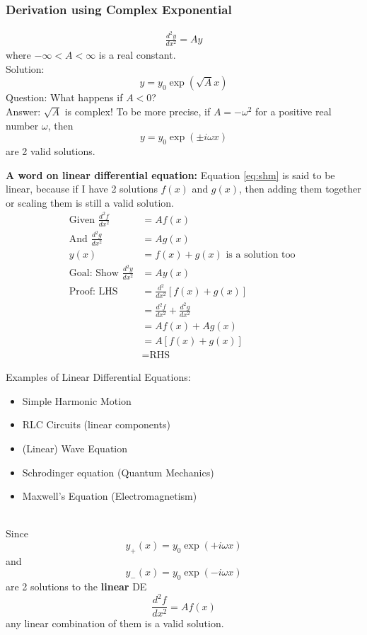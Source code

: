 \documentclass{article}
\begin{document}
\subsubsection{Derivation using Complex Exponential }
\begin{align}
    \frac{d^2 y}{ dx^2} = A y     \label{eq:shm}
\end{align}
where $-\infty < A < \infty$ is a real constant.\\[10pt]
Solution: $$y=y_0 \exp(\sqrt{A}x)$$ 
Question: What happens if $A < 0$? \\
Answer: $\sqrt{A}$ is complex! To be more precise, if $A=-\omega^2$ for a positive real number $\omega$, then 
$$y=y_0 \exp(\pm i \omega x)$$
are 2 valid solutions.

\textbf{A word on linear differential equation: } Equation \ref{eq:shm} is said to be linear, because if I have 2 solutions $f(x)$ and $g(x)$, then adding them together or scaling them is still a valid solution.
\begin{align}
    \text{Given } \frac{d^2 f}{ dx^2} &= A f(x)\\
    \text{And } \frac{d^2 g}{ dx^2} &= A g(x) \\
    y(x) &= f(x) + g(x)\text{ is a solution too }\\
    \text{Goal: Show } \frac{d^2y}{dx^2} & = Ay(x)\\
    \text{Proof: LHS} &= \frac{d^2}{dx^2} [f(x)+g(x)] \\
    &= \frac{d^2 f}{dx^2} + \frac{d^2 g}{dx^2} \\ 
    &= A f(x) + A g(x) \\
    &= A [f(x) + g(x)] \\
    &= \text{RHS}
\end{align}

Examples of Linear Differential Equations:
\begin{itemize}
    \item Simple Harmonic Motion
    \item RLC Circuits (linear components)
    \item (Linear) Wave Equation
    \item Schrodinger equation (Quantum Mechanics)
    \item Maxwell's Equation (Electromagnetism)
\end{itemize}
\leavevmode \\
Since $$y_+(x)=y_0 \exp(+ i \omega x)$$ and $$y_-(x) = y_0 \exp(- i \omega x)$$ are 2 solutions to the \textbf{linear} DE $$\frac{d^2 f}{ dx^2} = A f(x)$$
any linear combination of them is a valid solution.
\end{document}
